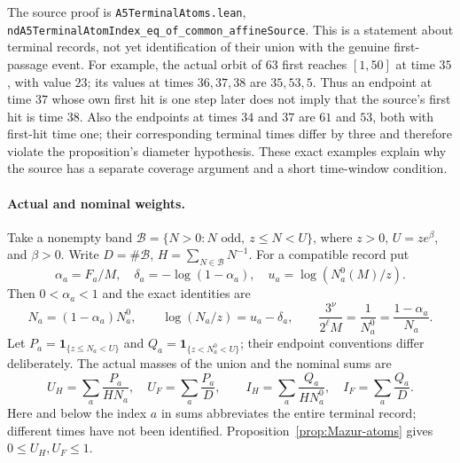 The source proof is
\texttt{A5TerminalAtoms.lean},
\texttt{ndA5TerminalAtomIndex\_eq\_of\_common\_affineSource}.
This is a statement about terminal records, not yet identification of
their union with the genuine first-passage event.
For example, the actual orbit of $63$ first reaches $[1,50]$ at
time $35$, with value $23$; its values at times $36,37,38$ are
$35,53,5$. Thus an endpoint at time $37$ whose own first hit is one
step later does not imply that the source's first hit is time $38$.
Also the endpoints at times $34$ and $37$ are $61$ and $53$,
both with first-hit time one; their corresponding terminal times differ
by three and therefore violate the proposition's diameter hypothesis.
These exact examples explain why the source has a separate coverage
argument and a short time-window condition.

\paragraph{Actual and nominal weights.}
Take a nonempty band
$\mathcal B=\{N>0:N\text{ odd},\ z\le N<U\}$, where
$z>0$, $U=ze^\beta$, and $\beta>0$.
Write $D=\#\mathcal B$, $H=\sum_{N\in\mathcal B}N^{-1}$.
For a compatible record put
\[
 \alpha_a=F_a/M,\quad
 \delta_a=-\log(1-\alpha_a),\quad
 u_a=\log(N_a^0(M)/z).
\]
Then $0<\alpha_a<1$ and the exact identities are
\[
 N_a=(1-\alpha_a)N_a^0,\qquad
 \log(N_a/z)=u_a-\delta_a,\qquad
 \frac{3^\nu}{2^\ell M}=\frac1{N_a^0}
                  =\frac{1-\alpha_a}{N_a}.
 \tag{*}
\]
Let $P_a=\mathbf1_{\{z\le N_a<U\}}$ and
$Q_a=\mathbf1_{\{z<N_a^0<U\}}$; their endpoint conventions differ
deliberately. The actual masses of the union and the nominal sums are
\[
 U_H=\sum_a\frac{P_a}{HN_a},\quad U_F=\sum_a\frac{P_a}{D},
 \qquad I_H=\sum_a\frac{Q_a}{HN_a^0},\quad I_F=\sum_a\frac{Q_a}{D}.
\]
Here and below the index $a$ in sums abbreviates the entire terminal
record; different times have not been identified.
Proposition~\ref{prop:Mazur-atoms} gives $0\le U_H,U_F\le1$.

